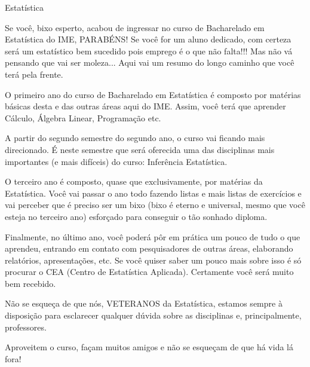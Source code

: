 \begin{subsecao}{Estatística}

Se você, bixo esperto, acabou de ingressar no curso de Bacharelado em
Estatística do IME, PARABÉNS! Se você for um aluno dedicado, com certeza será
um estatístico bem sucedido pois emprego é o que não falta!!! Mas não vá
pensando que vai ser moleza... Aqui vai um resumo do longo caminho que você
terá pela frente.

O primeiro ano do curso de Bacharelado em Estatística é composto por matérias
básicas desta e das outras áreas aqui do IME. Assim, você terá que aprender
Cálculo, Álgebra Linear, Programação etc.

A partir do segundo semestre do segundo ano, o curso vai ficando mais
direcionado. É neste semestre que será oferecida uma das disciplinas mais
importantes (e mais difíceis) do curso: Inferência Estatística.

O terceiro ano é composto, quase que exclusivamente, por matérias da
Estatística. Você vai passar o ano todo fazendo listas e mais listas de
exercícios e vai perceber que é preciso ser um bixo (bixo é eterno e universal,
mesmo que você esteja no terceiro ano) esforçado para conseguir o tão sonhado
diploma.

Finalmente, no último ano, você poderá pôr em prática um pouco de tudo o que
aprendeu, entrando em contato com pesquisadores de outras áreas, elaborando
relatórios, apresentações, etc. Se você quiser saber um pouco mais sobre isso é
só procurar o CEA (Centro de Estatística Aplicada). Certamente você será muito
bem recebido.

Não se esqueça de que nós, VETERANOS da Estatística, estamos sempre à
disposição para esclarecer qualquer dúvida sobre as disciplinas e,
principalmente, professores.

Aproveitem o curso, façam muitos amigos e não se esqueçam de que há vida lá fora!

\end{subsecao}
